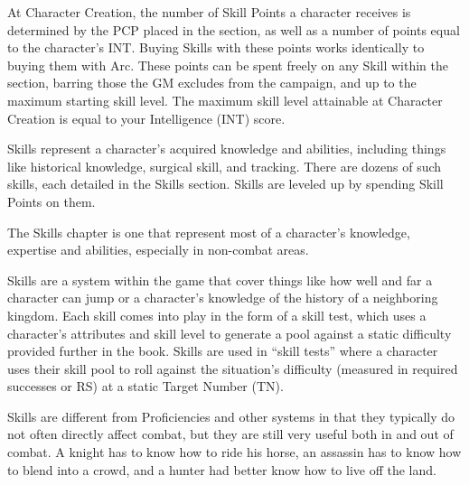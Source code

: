 \documentclass[oneside,11pt,english]{book}
\begin{document}
At Character Creation, the number of Skill Points a character receives is determined by the PCP placed in 
the section, as well as a number of points equal to the character’s INT. Buying Skills with these points 
works identically to buying them with Arc. These points can be spent freely on any Skill within the 
section, barring those the GM excludes from the campaign, and up to the maximum starting skill level. 
The maximum skill level attainable at Character Creation is equal to your Intelligence (INT) score. 


Skills represent a character's acquired knowledge and abilities, including things like historical knowledge, 
surgical skill, and tracking. There are dozens of such skills, each detailed in the Skills section. Skills are leveled up by spending Skill Points on them. 


The Skills chapter is one that represent most of a character’s knowledge, expertise and abilities, especially in non-combat areas.


Skills are a system within the game that cover things like how well and far a
character can jump or a character’s knowledge of the history of a neighboring
kingdom. Each skill comes into play in the form of a skill test, which uses a
character’s attributes and skill level to generate a pool against a static
difficulty provided further in the book. Skills are used in “skill tests” where
a character uses their skill pool to roll against the situation’s difficulty
(measured in required successes or RS) at a static Target Number (TN). 


Skills are different from Proficiencies and other systems in that they typically
do not often directly affect combat, but they are still very useful both in and
out of combat. A knight has to know how to ride his horse, an assassin has to
know how to blend into a crowd, and a hunter had better know how to live off the
land. 
\end{document}
